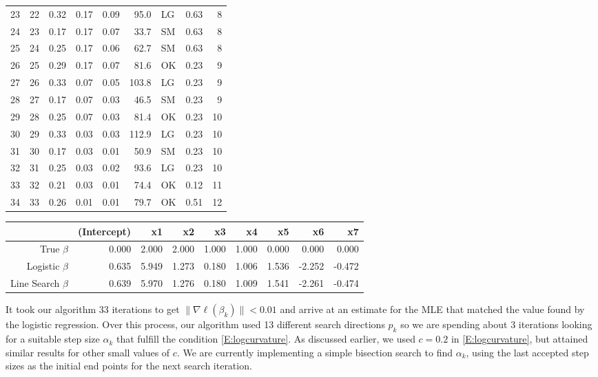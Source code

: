\begin{table}[ht!]
\begin{center}
\begin{tabular}{rrrrrrlrr}
  23 & 22 & 0.32 & 0.17 & 0.09 & 95.0 & LG & 0.63 & 8 \\ 
  24 & 23 & 0.17 & 0.17 & 0.07 & 33.7 & SM & 0.63 & 8 \\ 
  25 & 24 & 0.25 & 0.17 & 0.06 & 62.7 & SM & 0.63 & 8 \\ 
  26 & 25 & 0.29 & 0.17 & 0.07 & 81.6 & OK & 0.23 & 9 \\ 
  27 & 26 & 0.33 & 0.07 & 0.05 & 103.8 & LG & 0.23 & 9 \\ 
  28 & 27 & 0.17 & 0.07 & 0.03 & 46.5 & SM & 0.23 & 9 \\ 
  29 & 28 & 0.25 & 0.07 & 0.03 & 81.4 & OK & 0.23 & 10 \\ 
  30 & 29 & 0.33 & 0.03 & 0.03 & 112.9 & LG & 0.23 & 10 \\ 
  31 & 30 & 0.17 & 0.03 & 0.01 & 50.9 & SM & 0.23 & 10 \\ 
  32 & 31 & 0.25 & 0.03 & 0.02 & 93.6 & LG & 0.23 & 10 \\ 
  33 & 32 & 0.21 & 0.03 & 0.01 & 74.4 & OK & 0.12 & 11 \\ 
  34 & 33 & 0.26 & 0.01 & 0.01 & 79.7 & OK & 0.51 & 12 \\ 
   \hline
\end{tabular}
\end{center}
\end{table}

\begin{table}[h!]
\begin{center}
\begin{tabular}{rrrrrrrrr}
  \hline
 & (Intercept) & x1 & x2 & x3 & x4 & x5 & x6 & x7 \\ 
  \hline
True $\beta$ & 0.000 & 2.000 & 2.000 & 1.000 & 1.000 & 0.000 & 0.000 & 0.000 \\ 
   Logistic $\beta$ & 0.635 & 5.949 & 1.273 & 0.180 & 1.006 & 1.536 & -2.252 & -0.472 \\ 
  Line Search $\beta$  & 0.639 & 5.970 & 1.276 & 0.180 & 1.009 & 1.541 & -2.261 & -0.474 \\ 
   \hline
\end{tabular}
\end{center}
\end{table}


It took our algorithm 33 iterations to get $\parallel \nabla \ell( \beta_k ) \parallel < 0.01$ and arrive at an estimate for the MLE that matched the value found by the logistic regression.  Over this process, our algorithm used 13 different search directions $p_k$ so we are spending about 3 iterations looking for a suitable step size $\alpha_k$ that fulfill the condition \eqref{E:logcurvature}.  As discussed earlier, we used $c=0.2$ in \eqref{E:logcurvature}, but attained similar results for other small values of $c$.  We are currently implementing a simple bisection search to find $\alpha_k$, using the last accepted step sizes as the initial end points for the next search iteration.  

